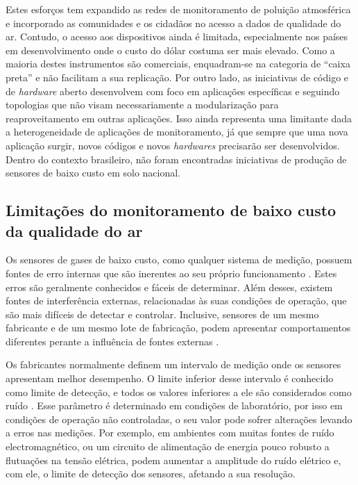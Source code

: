 Estes esforços tem expandido as redes de monitoramento de poluição atmosférica e incorporado as comunidades e os cidadãos no acesso a dados de qualidade do ar. Contudo, o acesso aos dispositivos ainda é limitada, especialmente nos países em desenvolvimento onde o custo do dólar costuma ser mais elevado. Como a maioria destes instrumentos são comerciais, enquadram-se na categoria de “caixa preta” e não facilitam a sua replicação. Por outro lado, as iniciativas de código e de \textit{hardware} aberto desenvolvem com foco em aplicações específicas e seguindo topologias que não visam necessariamente a modularização para reaproveitamento em outras aplicações. Isso ainda representa uma limitante dada a heterogeneidade de aplicações de monitoramento, já que sempre que uma nova aplicação surgir, novos códigos e novos \textit{hardwares} precisarão ser desenvolvidos. Dentro do contexto brasileiro, não foram encontradas iniciativas de produção de sensores de baixo custo em solo nacional.

\subsection{Limitações do monitoramento de baixo custo da qualidade do ar}\label{subsection:low-cost-monit-limits}

Os sensores de gases de baixo custo, como qualquer sistema de medição, possuem fontes de erro internas que são inerentes ao seu próprio funcionamento \cite{Maag2018ADeployments}. Estes erros são geralmente conhecidos e fáceis de determinar. Além desses, existem fontes de interferência externas, relacionadas às suas condições de operação, que são mais difíceis de detectar e controlar. Inclusive, sensores de um mesmo fabricante e de um mesmo lote de fabricação, podem apresentar comportamentos diferentes perante a influência de fontes externas \cite{Alphasense2013AlphasenseHUMIDITY,Castell2017CanEstimates}.

Os fabricantes normalmente definem um intervalo de medição onde os sensores apresentam melhor desempenho. O limite inferior desse intervalo é conhecido como limite de detecção, e todos os valores inferiores a ele são considerados como ruído \cite{Maag2018ADeployments}. Esse parâmetro é determinado em condições de laboratório, por isso em condições de operação não controladas, o seu valor pode sofrer alterações levando a erros nas medições. Por exemplo, em ambientes com muitas fontes de ruído electromagnético, ou um circuito de alimentação de energia pouco robusto a flutuações na tensão elétrica, podem aumentar a amplitude do ruído elétrico e, com ele, o limite de detecção dos sensores, afetando a sua resolução.

